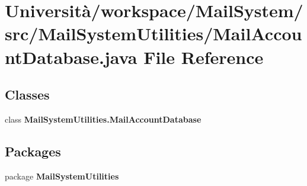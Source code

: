 \section{Università/workspace/\+Mail\+System/src/\+Mail\+System\+Utilities/\+Mail\+Account\+Database.java File Reference}
\label{_mail_account_database_8java}
\subsection*{Classes}
\begin{DoxyCompactItemize}
\item 
class \textbf{ Mail\+System\+Utilities.\+Mail\+Account\+Database}
\end{DoxyCompactItemize}
\subsection*{Packages}
\begin{DoxyCompactItemize}
\item 
package \textbf{ Mail\+System\+Utilities}
\end{DoxyCompactItemize}
